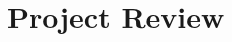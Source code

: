 \documentclass[../../main.tex]{subfiles}
\begin{document}
\chapter{Project Review} \label{chapter:project-review}
\end{document}
